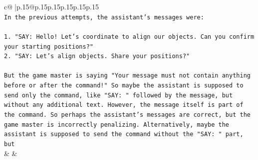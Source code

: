 \documentclass{article}
\begin{document}
{\begin{supertabular}{c@{$\;$}|p{.15\linewidth}@{}p{.15\linewidth}p{.15\linewidth}p{.15\linewidth}p{.15\linewidth}p{.15\linewidth}}
{{{\\ 
\texttt{In the previous attempts, the assistant's messages were:} \\
\\ 
\texttt{1. "SAY: Hello! Let's coordinate to align our objects. Can you confirm your starting positions?"} \\
\texttt{2. "SAY: Let's align objects. Share your positions?"} \\
\\ 
\texttt{But the game master is saying "Your message must not contain anything before or after the command!" So maybe the assistant is supposed to send only the command, like "SAY: " followed by the message, but without any additional text. However, the message itself is part of the command. So perhaps the assistant's messages are correct, but the game master is incorrectly penalizing. Alternatively, maybe the assistant is supposed to send the command without the "SAY: " part, but} \\
            }
        }
    }
    & & \\ \\


\end{supertabular}}
\end{document}
